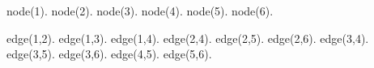node(1).    node(2).    node(3).   node(4).    node(5).    node(6).

edge(1,2).  edge(1,3).  edge(1,4). edge(2,4).  edge(2,5).  edge(2,6).  
edge(3,4).  edge(3,5).  edge(3,6). edge(4,5).  edge(5,6).  
